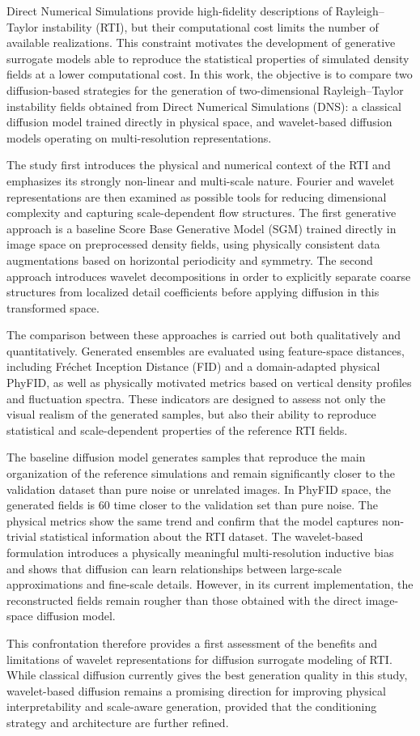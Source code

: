 ﻿Direct Numerical Simulations provide high-fidelity descriptions of
Rayleigh--Taylor instability (RTI), but their computational cost limits the number of
available realizations. This constraint motivates the development of generative
surrogate models able to reproduce the statistical properties of simulated
density fields at a lower computational cost. In this work, the objective is to
compare two diffusion-based strategies for the generation of two-dimensional
Rayleigh--Taylor instability fields obtained from Direct Numerical Simulations (DNS): a classical diffusion
model trained directly in physical space, and wavelet-based diffusion models
operating on multi-resolution representations.

The study first introduces the physical and numerical context of the
RTI and emphasizes its strongly non-linear and
multi-scale nature. Fourier and wavelet representations are then examined as
possible tools for reducing dimensional complexity and capturing scale-dependent
flow structures. The first generative approach is a baseline Score Base Generative Model (SGM) trained directly in image space on preprocessed
density fields, using physically consistent data augmentations based on horizontal
periodicity and symmetry. The second approach introduces wavelet decompositions
in order to explicitly separate coarse structures from localized detail
coefficients before applying diffusion in this transformed space.

The comparison between these approaches is carried out both qualitatively and
quantitatively. Generated ensembles are evaluated using feature-space
distances, including Fréchet Inception Distance (FID) and a domain-adapted physical
PhyFID, as well as physically
motivated metrics based on vertical density profiles and fluctuation spectra.
These indicators are designed to assess not only the visual realism of the
generated samples, but also their ability to reproduce statistical and
scale-dependent properties of the reference RTI fields.

The baseline diffusion model generates samples that reproduce the main
organization of the reference simulations and remain significantly closer to
the validation dataset than pure noise or unrelated images. In PhyFID space,
the generated fields is 60 time closer to the validation set than pure noise. The physical metrics show
the same trend and confirm that the model captures non-trivial statistical
information about the RTI dataset. The wavelet-based formulation introduces a
physically meaningful multi-resolution inductive bias and shows that diffusion
can learn relationships between large-scale approximations and fine-scale
details. However, in its current implementation, the reconstructed fields remain
rougher than those obtained with the direct image-space diffusion model.

This confrontation therefore provides a first assessment of the benefits and
limitations of wavelet representations for diffusion surrogate modeling of
RTI. While classical diffusion currently gives the
best generation quality in this study, wavelet-based diffusion remains a
promising direction for improving physical interpretability and scale-aware
generation, provided that the conditioning strategy and architecture are further
refined.

